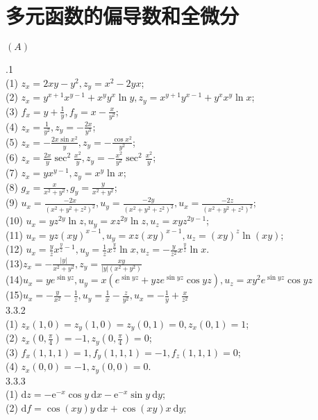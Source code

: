 \documentclass[a4paper,11pt,UTF8]{article}
\begin{document}
\section{多元函数的偏导数和全微分}
\centerline{$(A)$}
.1\\ (1) $z_x=2 x y-y^2, z_y=x^2-2 y x$;\\
(2) $z_x=y^{x+1}x^{y-1}+x^yy^x\ln y,z_y=x^{y+1}y^{x-1}+y^xx^y\ln x$;\\
(3) $f_x=y+\frac{1}{y}, f_y=x-\frac{x}{y^2}$;\\
(4) $z_x=\frac{1}{y^2}, z_y=-\frac{2 x}{y^3}$;\\
(5) $z_x=-\frac{2 x \sin x^2}{y}, z_y=-\frac{\cos x^2}{y^2}$;\\
(6) $z_x=\frac{2 x}{y} \sec ^2 \frac{x^2}{y}, z_y=-\frac{x^2}{y^2} \sec ^2 \frac{x^2}{y}$;\\
(7) $z_x=y x^{y-1}, z_y=x^y \ln x$;\\
(8) $g_x=\frac{x}{x^2+y^2}, g_y=\frac{y}{x^2+y^2}$;\\
(9) $u_x=\frac{-2 x}{\left(x^2+y^2+z^2\right)^2}, u_y=\frac{-2 y}{\left(x^2+y^2+z^2\right)^2}, u_x=\frac{-2 z}{\left(x^2+y^2+z^2\right)^2}$;\\
(10) $u_x=y z^{2 y} \ln z, u_y=x z^{2 y} \ln z, u_z=x y z^{2 y-1}$;\\
(11) $u_x=y z(x y)^{x-1}, u_y=x z(x y)^{x-1}, u_z=(x y)^z \ln (x y)$;\\
(12) $u_x=\frac{y}{z} x^{\frac{y}{z}-1}, u_y=\frac{1}{z} x^{\frac{y}{z}} \ln x, u_z=-\frac{y}{z^2} x^{\frac{y}{z}} \ln x$.\\
(13)$z_x=-\frac{|y|}{x^2+y^2},z_y=\frac{xy}{|y|(x^2+y^2)}$\\
(14)$u_x=ye^{\sin yz},u_y =x(e^{\sin yz}+yze^{\sin yz}\cos yz),u_z=xy^2e^{\sin yz}\cos yz$ \\
(15)$u_x=-\frac{y}{x^2}-\frac{1}{z},u_y=\frac{1}{x}-\frac{z}{y^2},u_x=-\frac{1}{y}+\frac{x}{z^2}$\\
3.3.2\\
(1) $z_x(1,0)=z_y(1,0)=z_y(0,1)=0, z_x(0,1)=1$;\\
(2) $z_x\left(0, \frac{\pi}{4}\right)=-1, z_y\left(0, \frac{\pi}{4}\right)=0$;\\
(3) $f_x(1,1,1)=1, f_y(1,1,1)=-1, f_z(1,1,1)=0$;\\
(4) $z_x(0,0)=-1, z_y(0,0)=0$.\\
3.3.3\\
(1) $\mathrm{d} z=-\mathrm{e}^{-x}\cos y \mathrm{~d} x-\mathrm{e}^{-x}\sin y \mathrm{~d} y$;\\
(2) $\mathrm{d} f=\cos (x y)y \mathrm{~d} x+\cos (x y)x \mathrm{~d} y$;\\
\end{document}
